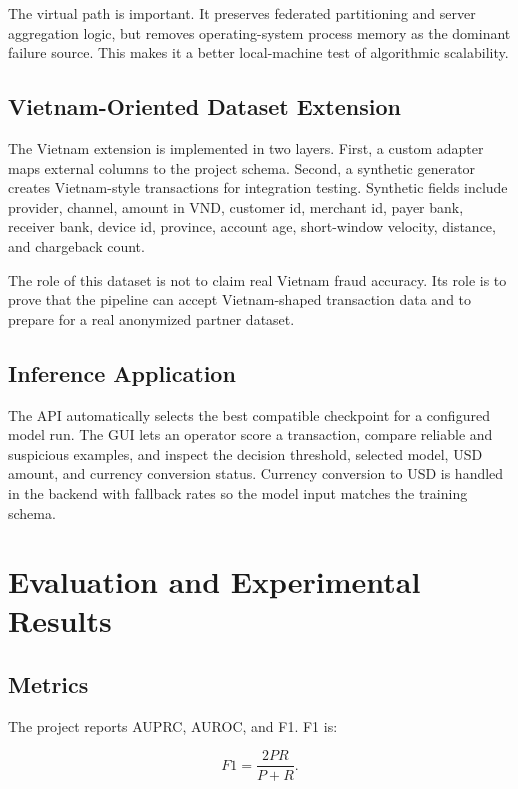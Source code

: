 \documentclass[conference]{IEEEtran}
\begin{document}
The virtual path is important. It preserves federated partitioning and server
aggregation logic, but removes operating-system process memory as the dominant
failure source. This makes it a better local-machine test of algorithmic
scalability.

\subsection{Vietnam-Oriented Dataset Extension}

The Vietnam extension is implemented in two layers. First, a custom adapter maps
external columns to the project schema. Second, a synthetic generator creates
Vietnam-style transactions for integration testing. Synthetic fields include
provider, channel, amount in VND, customer id, merchant id, payer bank, receiver
bank, device id, province, account age, short-window velocity, distance, and
chargeback count.

The role of this dataset is not to claim real Vietnam fraud accuracy. Its role
is to prove that the pipeline can accept Vietnam-shaped transaction data and to
prepare for a real anonymized partner dataset.

\subsection{Inference Application}

The API automatically selects the best compatible checkpoint for a configured
model run. The GUI lets an operator score a transaction, compare reliable and
suspicious examples, and inspect the decision threshold, selected model, USD
amount, and currency conversion status. Currency conversion to USD is handled
in the backend with fallback rates so the model input matches the training
schema.

\section{Evaluation and Experimental Results}

\subsection{Metrics}

The project reports AUPRC, AUROC, and F1. F1 is:

\begin{equation}
F1=\frac{2PR}{P+R}.
\end{equation}
\end{document}
